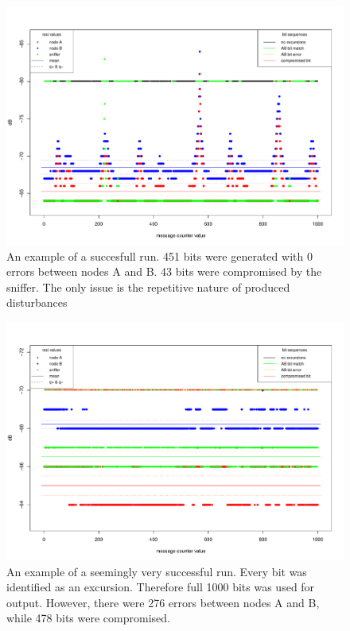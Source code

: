 \documentclass[
  print, %
  Table,   %
  nolof,     %
  nolot,     %
           oneside
]{fithesis3}
\begin{document}
\begin{figure}
  \includegraphics[height=\textwidth, angle = 90 ]{../images/graph_rssi_02.pdf}
\caption{An example of a succesfull run. 451 bits were generated with 0 errors between nodes A and B. 43 bits were compromised by the sniffer. The only issue is the repetitive nature of produced disturbances}
\label{fig:rssi_02}
\end{figure}

\begin{figure}
  \includegraphics[height=\textwidth, angle = 90 ]{../images/graph_rssi_03.pdf}
\caption{An example of a seemingly very successful run. Every bit was identified as an excursion. Therefore full 1000 bits was used for output. However, there were 276 errors between nodes A and B, while 478 bits were compromised.}
\label{fig:rssi_03}
\end{figure}
\end{document}
